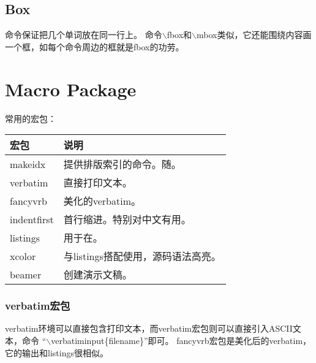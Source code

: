
\subsection{Box}
\par
{}\par
{}\par
{}\par
{}\par
{}\par

命令保证把几个单词放在同一行上。
命令$\backslash$fbox和$\backslash$mbox类似，它还能围绕内容画一个框，如每个命令周边的框就是fbox的功劳。


\section{Macro Package}
常用的宏包：\\
\begin{tabular}{|l|l|}
\hline
宏包            & 说明 \\ \hline
makeidx         & 提供排版索引的命令。随。\\ \hline
verbatim        & 直接打印文本。\\ \hline
fancyvrb        & 美化的verbatim。\\ \hline
indentfirst     & 首行缩进。特别对中文有用。 \\ \hline
listings        & 用于在。\\ \hline
xcolor          & 与listings搭配使用，源码语法高亮。 \\ \hline
beamer          & 创建演示文稿。\\\hline
\end{tabular}

\subsubsection{verbatim宏包}\label{latex-macro-package-verbatim}
verbatim环境可以直接包含打印文本，而verbatim宏包则可以直接引入ASCII文本，命令
``$\backslash$verbatiminput\{filename\}''即可。
fancyvrb宏包是美化后的verbatim，它的输出和listings很相似。

